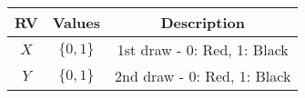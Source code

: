 
\begin{center}
\begin{tabular}{|c|c|c|}
\hline
\textbf{RV}& \textbf{Values} & \textbf{Description} \\ \hline
$X$		   & 	$\{0,1\}$	&  1st draw - 0: Red, 1: Black\\ \hline
$Y$ 		   & 	$\{0,1\}$	&  2nd draw - 0: Red, 1: Black\\ \hline
\end{tabular}
\end{center}

